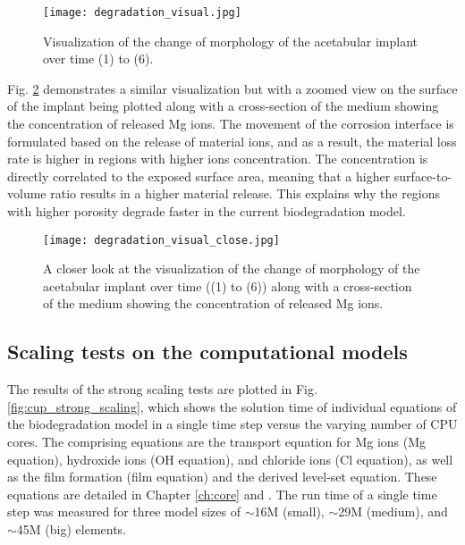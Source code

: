 \begin{figure}[h]
\centering
\medskip
\texttt{[image: degradation\_visual.jpg]}
\caption[Visualization of the change of morphology of the acetabular implant]{Visualization of the change of morphology of the acetabular implant over time (1) to (6).} \label{fig:cup_degradation_visual}
\end{figure}

Fig. \ref{fig:cup_degradation_visual_close} demonstrates a similar visualization but with a zoomed view on the surface of the implant being plotted along with a cross-section of the medium showing the concentration of released Mg ions. The movement of the corrosion interface is formulated based on the release of material ions, and as a result, the material loss rate is higher in regions with higher ions concentration. The concentration is directly correlated to the exposed surface area, meaning that a higher surface-to-volume ratio results in a higher material release. This explains why the regions with higher porosity degrade faster in the current biodegradation model.%

\begin{figure}[h]
\centering
\medskip
\texttt{[image: degradation\_visual\_close.jpg]}
\caption[Visualization of the change of morphology of the acetabular implant]{A closer look at the visualization of the change of morphology of the acetabular implant over time ((1) to (6)) along with a cross-section of the medium showing the concentration of released Mg ions.} \label{fig:cup_degradation_visual_close}
\end{figure}

\subsection{Scaling tests on the computational models}

The results of the strong scaling tests are plotted in Fig. \ref{fig:cup_strong_scaling}, which shows the solution time of individual equations of the biodegradation model in a single time step versus the varying number of \gls{CPU} cores. The comprising equations are the transport equation for Mg ions (Mg equation), hydroxide ions (OH equation), and chloride ions (Cl equation), as well as the film formation (film equation) and the derived level-set equation. These equations are detailed in Chapter \ref{ch:core} and \cite{Barzegari2021}. The run time of a single time step was measured for three model sizes of $\sim$16M (small), $\sim$29M (medium), and $\sim$45M (big) elements.

